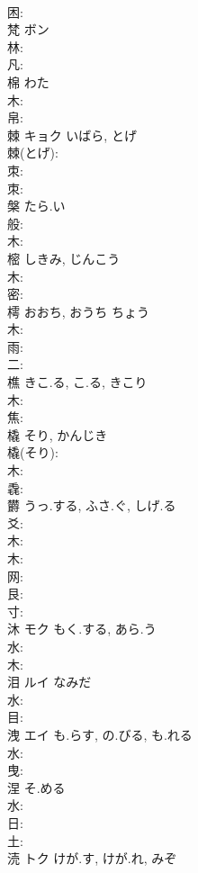 \documentclass[8pt]{extreport}
\begin{document}
\begin{CJK}{UTF8}{min}
\\	困: 
\\	梵	ボン			
\\	林: 
\\	凡: 
\\	棉		わた			
\\	木: 
\\	帛: 
\\	棘	キョク	いばら, とげ		
\\	棘(とげ): 
\\	朿: 
\\	朿: 
\\	槃		たら.い			
\\	般: 
\\	木: 
\\	樒		しきみ, じんこう			
\\	木: 
\\	密: 
\\	樗		おおち, おうち	ちょう		
\\	木: 
\\	雨: 
\\	二: 
\\	樵		きこ.る, こ.る, きこり			
\\	木: 
\\	焦: 
\\	橇		そり, かんじき			
\\	橇(そり): 
\\	木: 
\\	毳: 
\\	欝		うっ.する, ふさ.ぐ, しげ.る			
\\	爻: 
\\	木: 
\\	木: 
\\	网: 
\\	艮: 
\\	寸: 
\\	沐	モク	もく.する, あら.う		
\\	水: 
\\	木: 
\\	泪	ルイ	なみだ			
\\	水: 
\\	目: 
\\	洩	エイ	も.らす, の.びる, も.れる		
\\	水: 
\\	曳: 
\\	涅		そ.める			
\\	水: 
\\	日: 
\\	土: 
\\	涜	トク	けが.す, けが.れ, みぞ		

\end{CJK}
\end{document}
